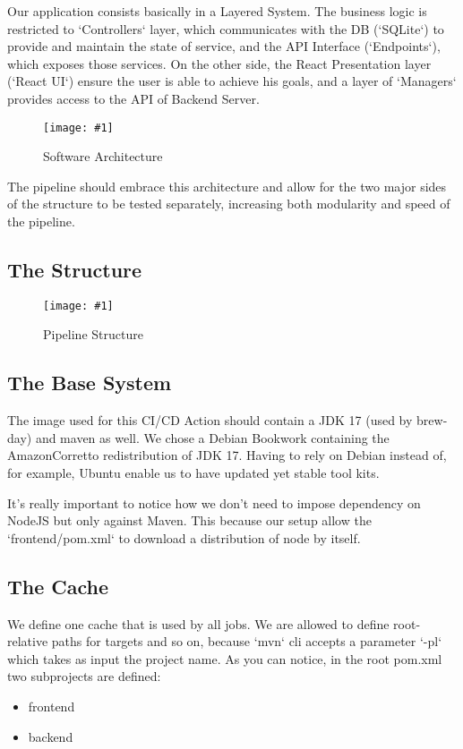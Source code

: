 \documentclass[a4paper,10pt]{scrartcl}
\newcommand{\putimage}[3] {
	\begin{figure}[H]
	    \centering
	    \texttt{[image: \#1]}
	    \caption{#2}\label{#3}
	\end{figure}
}
\begin{document}
Our application consists basically in a Layered System. The business logic is restricted to `Controllers` layer, which communicates with the DB (`SQLite`) to provide and maintain the state of service, and the API Interface (`Endpoints`), which exposes those services. On the other side, the React Presentation layer (`React UI`) ensure the user is able to achieve his goals, and a layer of `Managers` provides access to the API of Backend Server.

\putimage{Arch.png}{Software Architecture}{fig:arch}

The pipeline should embrace this architecture and allow for the two major sides of the structure to be tested separately, increasing both modularity and speed of the pipeline.

\subsection{The Structure}

\putimage{Pipeline.png}{Pipeline Structure}{fig:arch}

\subsection{The Base System}

The image used for this CI/CD Action should contain a JDK 17 (used by brew-day) and maven as well. We chose a Debian Bookwork containing the AmazonCorretto redistribution of JDK 17. Having to rely on Debian instead of, for example, Ubuntu enable us to have updated yet stable tool kits.

It's really important to notice how we don't need to impose dependency on NodeJS but only against Maven. This because our setup allow the `frontend/pom.xml` to download a distribution of node by itself.

\subsection{The Cache}

We define one cache that is used by all jobs. We are allowed to define root-relative paths for targets and so on, because `mvn` cli accepts a parameter `-pl` which takes as input the project name. As you can notice, in the root pom.xml two subprojects are defined:

\begin{itemize}
    \item frontend
    \item backend
\end{itemize}
\end{document}
